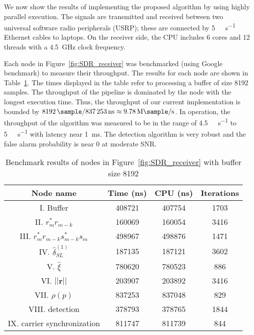 We now show the results of implementing the proposed algorithm
by using
highly parallel execution.
The signals are transmitted and received between two universal software radio peripherals (USRP);
these are connected by \SI[per-mode=symbol]{5}{\giga\bits\per\second} Ethernet cables to
laptops.
On the receiver side, 
the CPU includes 6 cores and 12 threads with a \SI{4.5}{\giga\hertz}
clock frequency.

Each node in Figure~\ref{fig:SDR_receiver} was benchmarked (using Google benchmark) to measure their throughput.
The results for each node are shown 
in Table~\ref{table:BM_function_nodes}.
The times displayed in the table
refer to processing a  buffer of size 8192 samples.
The throughput of the 
pipeline is dominated by the node with the longest execution time.
Thus, the  throughput of our current implementation is bounded by
$\SI{8192}{\sample}/\SI{837253}{\nano\second}  \approx \SI[per-mode=symbol]{9.78}{\mega\sample\per\second}$.
In operation, the throughput of the algorithm was measured to be in
the range of
\SI[per-mode=symbol]{4.5}{\mega\sample\per\second} to \SI[per-mode=symbol]{5}{\mega\sample\per\second} with latency near \SI{1}{\milli\second}.
The detection algorithm is very robust and the false alarm probability is near 0 at moderate SNR.

\begin{table}[t]
    \caption{Benchmark results of nodes in Figure~\ref{fig:SDR_receiver} with buffer size 8192}  %
    \centering %
    \begin{tabular}{c c c c} %
    \hline\hline %
    Node name & Time (ns) & CPU (ns) & Iterations \\ [0.5ex] %
    \hline %
    I. Buffer  & 408721 & 407754 & 1703 \\ %
    II. $r_m^*r_{m-k}$  & 160069 & 160054 & 3416 \\
    III. $r_m^*r_{m-k}s_{m-k}^*s_m$ & 498967 & 498876 & 1471 \\
    IV. $\hat{\delta}_{SL}^{(1)}$ & 187135 & 187121 & 3602 \\
    V. $\hat{\xi}$ & 780620 & 780523 & 886 \\
    VI. $||\bm{r}||$ & 203907 & 203892 & 3416 \\ %
    VII. $\rho(p)$ & 837253 & 837048 & 829 \\
    VIII. detection & 378793 & 378765 & 1844 \\
    IX. carrier synchronization & 811747 & 811739 & 844  \\ [1ex]
    \hline
    \end{tabular}
    \label{table:BM_function_nodes} %
  \end{table}


